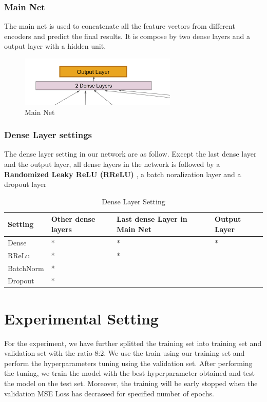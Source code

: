\documentclass{article}
\begin{document}
\subsubsection{Main Net}

The main net is used to concatenate all the feature vectors from different encoders and predict the final results. It is compose by two dense layers and a output layer with a hidden unit.

\begin{figure}[h]
  \centering
  \includegraphics[scale=1]{main.png}
  \caption{Main Net}
\end{figure}

\subsubsection{Dense Layer settings}

The dense layer setting in our network are as follow. Except the last dense layer and the output layer, all dense layers in the network is followed by a \textbf{Randomized Leaky ReLU (RReLU)} , a batch noralization layer and a dropout layer

\begin{table}[htb]
	\caption{Dense Layer Setting}
	\label{sample-table}
	\centering
	\begin{tabular}{llll}
		\toprule
		\cmidrule{1-4}
		Setting & Other dense layers  & Last dense Layer in Main Net & Output Layer \\
		\midrule
		Dense & * & * & *\\
		RReLu & * & *\\
		BatchNorm & * &\\
		Dropout & * &\\
		\midrule
	\end{tabular}
\end{table}



\section{Experimental Setting}

For the experiment, we have further splitted the training set into training set and validation set with the ratio 8:2. We use the train using our training set and perform the hyperparameters tuning using the validation set. After performing the tuning, we train the model with the best hyperparameter obtained and test the model on the test set.
Moreover, the training will be early stopped when the validation MSE Loss has decraseed for specified number of epochs.
\end{document}
